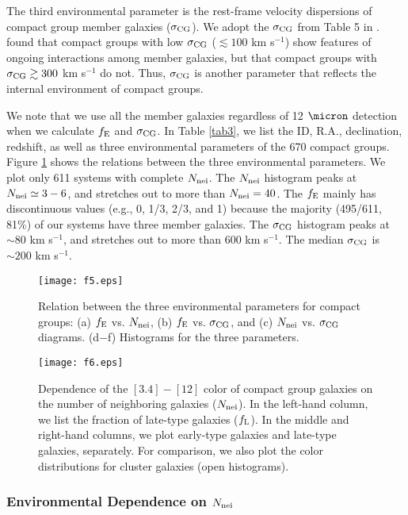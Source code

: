 \documentclass[12pt,preprint,apj]{emulateapj}
\newcommand{\efrac}{f_{\rm E}}
\newcommand{\nbg}{N_{\rm nei}}
\begin{document}
The third environmental parameter is the rest-frame velocity dispersions of 
compact group member galaxies ($\sigma_{\rm CG}$). 
We adopt the $\sigma_{\rm CG}$ from Table 5 in \citet{sohn+16}.
\citet{sohn+16} found that compact groups with low $\sigma_{\rm CG}$ 
($\lesssim100$ km s$^{-1}$) show features of ongoing interactions among member 
galaxies, but that compact groups with $\sigma_{\rm CG}\gtrsim300$ km s$^{-1}$ 
do not. 
Thus, $\sigma_{\rm CG}$ is another parameter that reflects the internal environment 
of compact groups. 

We note that we use all the member galaxies regardless of 
12 $\micron$ detection
when we calculate $f_{\rm E}$ and $\sigma_{\rm CG}$.
In Table \ref{tab3}, we list the ID, R.A., declination, redshift, 
as well as three environmental parameters of the 670 compact groups.
Figure \ref{cg_nc_efrac} shows the relations between the three environmental 
parameters. We plot only 611 systems with complete $\nbg$.
The $\nbg$ histogram peaks at $\nbg\simeq3-6$, 
and stretches out to more than $\nbg=40$.
The $\efrac$ mainly has discontinuous values (e.g., 0, 1/3, 2/3, and 1)
because the majority (495/611, 81\%) 
of our systems have three member galaxies.
The $\sigma_{\rm CG}$ histogram peaks at $\sim80$ km s$^{-1}$, and 
stretches out to more than 600 km s$^{-1}$. The median $\sigma_{\rm CG}$ 
is $\sim200$ km s$^{-1}$. 

\begin{figure}[b]
\centering
\texttt{[image: f5.eps]}
\caption{Relation between the three environmental parameters for compact groups: 
(a) $\efrac$ vs. $\nbg$, (b) $\efrac$ vs. $\sigma_{\rm CG}$, and 
(c) $\nbg$ vs. $\sigma_{\rm CG}$ diagrams. (d$-$f) Histograms for 
the three parameters.}
\label{cg_nc_efrac}
\end{figure}

\begin{figure*}
\centering
\texttt{[image: f6.eps]}
\caption{Dependence of the $[3.4]-[12]$ color of compact group galaxies 
on the number of neighboring galaxies ($\nbg$). In the left-hand column, 
we list the fraction of late-type galaxies ($f_{\rm L}$).  
In the middle and right-hand columns, we plot early-type galaxies and late-type galaxies,
separately. For comparison,
we also plot the color distributions for cluster galaxies (open histograms).
}
\label{w13abhist_nbg}
\end{figure*}


\subsubsection{Environmental Dependence on $\nbg$}
\end{document}
